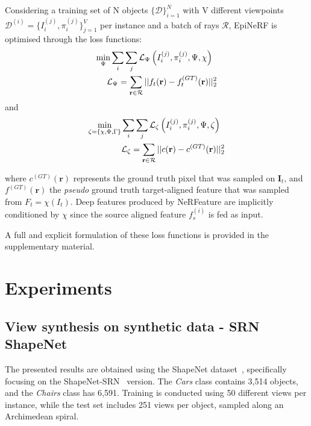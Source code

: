Considering a training set of N objects $\{\mathcal{D}\}_{i=1}^{N}$ with V different viewpoints $\mathcal{D}^{(i)} = \{I_{i}^{(j)},\pi_{i}^{(j)}\}_{j=1}^{V}$ per instance and a batch of rays $\mathcal{R}$, EpiNeRF is optimised through the loss functions: 
\begin{equation}
\label{eq:nerfeature_loss}
\begin{split}
 \min_{\Psi} \sum_{i}\sum_{j}\mathcal{L}_{\Psi}\left(I_{i}^{(j)},\pi_{i}^{(j)},\Psi,\chi \right) \hspace{.2cm} \\ \hspace{.2cm}\mathcal{L}_{\Psi}= \sum_{\mathbf{r}\in\mathcal{R}} || f_{t}(\mathbf{r}) - f_{t}^{(GT)}(\mathbf{r}) ||_{2}^{2}
\end{split}
\end{equation}
and 
\begin{equation}
\label{eq:epinerf_loss}
\begin{split}
 \min_{\zeta=\{\chi,\Phi,\Gamma\}}\sum_{i}\sum_{j}\mathcal{L}_{\zeta}\left(I_{i}^{(j)},\pi_{i}^{(j)},\Psi,\zeta \right)\hspace{.2cm}  \\ \hspace{.2cm}\mathcal{L}_{\zeta}= \sum_{\mathbf{r}\in\mathcal{R}} || c(\mathbf{r}) - c^{(GT)}(\mathbf{r}) ||_{2}^{2}
\end{split}
\end{equation}


where $c^{(GT)}(\mathbf{r})$ represents the ground truth pixel that was sampled on $\mathbf{I}_{t}$, and $f^{(GT)}(\mathbf{r})$ the \textit{pseudo} ground truth target-aligned feature that was sampled from $F_{t}=\chi(I_{t})$. Deep features produced by NeRFeature are implicitly conditioned by $\chi$ since the source aligned feature $f_s^{(i)}$ is fed as input. 

A full and explicit formulation of these loss functions is provided in the supplementary material.

\section{Experiments}
\label{subsec:epinerf/experiments}
\subsection{View synthesis on synthetic data - SRN ShapeNet}
The presented results are obtained using the ShapeNet dataset~\citep{chang2015shapenet}, specifically focusing on the ShapeNet-SRN~\citep{sitzmann2019scene} version. The \textit{Cars} class contains 3,514 objects, and the \textit{Chairs} class has 6,591. Training is conducted using 50 different views per instance, while the test set includes 251 views per object, sampled along an Archimedean spiral.\newline

